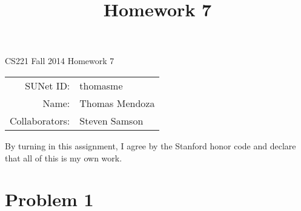 \documentclass[12pt]{article}
\title{Homework 7}
\begin{document}
\begin{center}
{\Large CS221 Fall 2014 Homework 7}

\begin{tabular}{rl}
SUNet ID: & thomasme \\
Name: & Thomas Mendoza \\
Collaborators: & Steven Samson
\end{tabular}
\end{center}

By turning in this assignment, I agree by the Stanford honor code and declare
that all of this is my own work.

\section*{Problem 1}
\end{document}
